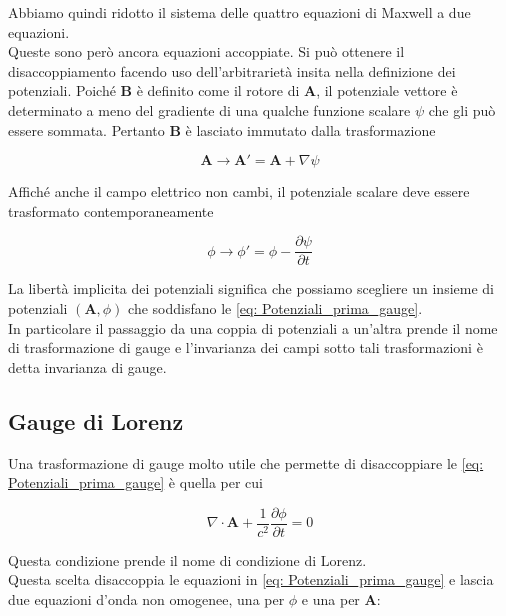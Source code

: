 Abbiamo quindi ridotto il sistema delle quattro equazioni di Maxwell a due equazioni. \\
Queste sono però ancora equazioni accoppiate. Si può ottenere il disaccoppiamento facendo uso dell'arbitrarietà insita nella definizione dei potenziali. Poiché $\mathbf{B}$ è definito come il rotore di $\mathbf{A}$, il potenziale vettore è determinato a meno del gradiente di una qualche funzione scalare $\psi$ che gli può essere sommata. Pertanto $\mathbf{B}$ è lasciato immutato dalla trasformazione

\begin{equation*}
    \mathbf{A} \to \mathbf{A'} = \mathbf{A} + \nabla \psi
\end{equation*}

Affiché anche il campo elettrico non cambi, il potenziale scalare deve essere trasformato contemporaneamente

\begin{equation}
    \phi \to \phi' = \phi - \frac{\partial \psi}{\partial t}
\end{equation}

La libertà implicita dei potenziali significa che possiamo scegliere un insieme di potenziali $(\mathbf{A}, \phi)$ che soddisfano le \ref{eq: Potenziali_prima_gauge}. \\
In particolare il passaggio da una coppia di potenziali a un'altra prende il nome di trasformazione di gauge e l'invarianza dei campi sotto tali trasformazioni è detta invarianza di gauge. 

\subsection{Gauge di Lorenz}

Una trasformazione di gauge molto utile che permette di disaccoppiare le \ref{eq: Potenziali_prima_gauge} è quella per cui 

\begin{tcolorbox}[colback=yellow!10!white, colframe=orange!70!black, boxrule=0.8pt]
\begin{equation}
    \nabla \cdot \mathbf{A} + \frac{1}{c^2} \frac{\partial \phi}{\partial t} = 0
\end{equation}
\end{tcolorbox}

Questa condizione prende il nome di condizione di Lorenz. \\
Questa scelta disaccoppia le equazioni in \ref{eq: Potenziali_prima_gauge} e lascia due equazioni d'onda non omogenee, una per $\phi$ e una per $\mathbf{A}$:

